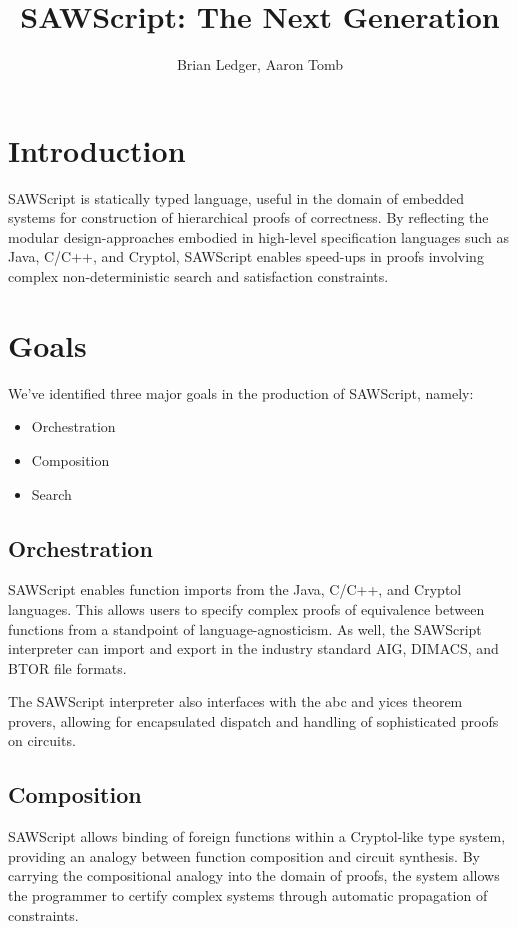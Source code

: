\documentclass[11pt]{amsart}
\title{SAWScript: The Next Generation}
\author{Brian Ledger, Aaron Tomb}
\begin{document}
\maketitle

\section*{Introduction}

SAWScript is statically typed language, useful in the domain of embedded systems for construction of hierarchical proofs of correctness.  By reflecting the modular design-approaches embodied in high-level specification languages such as Java, C/C++, and Cryptol, SAWScript enables speed-ups in proofs involving complex non-deterministic search and satisfaction constraints.

\section*{Goals}

We've identified three major goals in the production of SAWScript, namely:

\begin{itemize}
\item Orchestration
\item Composition
\item Search
\end{itemize}


\subsection*{Orchestration} SAWScript enables function imports from the Java, C/C++, and Cryptol languages.  This allows users to specify complex proofs of equivalence between functions from a standpoint of language-agnosticism.  As well, the SAWScript interpreter can import and export in the industry standard AIG, DIMACS, and BTOR file formats.

The SAWScript interpreter also interfaces with the abc and yices theorem provers, allowing for encapsulated dispatch and handling of sophisticated proofs on circuits.

\subsection*{Composition}

SAWScript allows binding of foreign functions within a Cryptol-like type system, providing an analogy between function composition and circuit synthesis.  By carrying the compositional analogy into the domain of proofs, the system allows the programmer to certify complex systems through automatic propagation of constraints.
\end{document}
